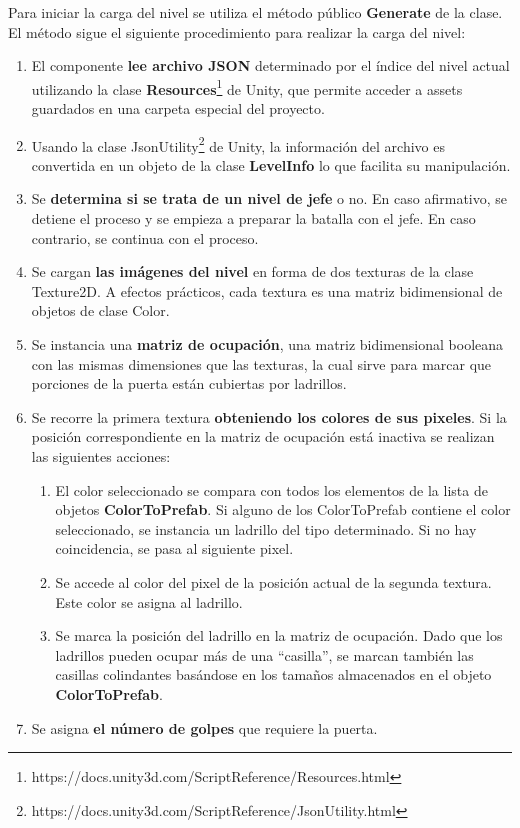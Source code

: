 Para iniciar la carga del nivel se utiliza el método público \textbf{Generate} de la clase. El método sigue el siguiente procedimiento para realizar la carga del nivel:
\begin{enumerate}
  \item El componente \textbf{lee archivo JSON} determinado por el índice del nivel actual utilizando la clase \textbf{Resources}\footnote{https://docs.unity3d.com/ScriptReference/Resources.html} de Unity, que permite acceder a assets guardados en una carpeta especial del proyecto. 
  \item Usando la clase JsonUtility\footnote{https://docs.unity3d.com/ScriptReference/JsonUtility.html} de Unity, la información del archivo es convertida en un objeto de la clase \textbf{LevelInfo} lo que facilita su manipulación.
  \item Se \textbf{determina si se trata de un nivel de jefe} o no. En caso afirmativo, se detiene el proceso y se empieza a preparar la batalla con el jefe. En caso contrario, se continua con el proceso.
  \item Se cargan \textbf{las imágenes del nivel} en forma de dos texturas de la clase Texture2D. A efectos prácticos, cada textura es una matriz bidimensional de objetos de clase Color. 
  \item Se instancia una \textbf{matriz de ocupación}, una matriz bidimensional booleana con las mismas dimensiones que las texturas, la cual sirve para marcar que porciones de la puerta están cubiertas por ladrillos.
  \item Se recorre la primera textura \textbf{obteniendo los colores de sus pixeles}. Si la posición correspondiente en la matriz de ocupación está inactiva se realizan las siguientes acciones:
  \begin{enumerate}
  \item El color seleccionado se compara con todos los elementos de la lista de objetos \textbf{ColorToPrefab}. Si alguno de los ColorToPrefab contiene el color seleccionado, se instancia un ladrillo del tipo determinado. Si no hay coincidencia, se pasa al siguiente pixel.
  \item Se accede al color del pixel de la posición actual de la segunda textura. Este color se asigna al ladrillo.
  \item Se marca la posición del ladrillo en la matriz de ocupación. Dado que los ladrillos pueden ocupar más de una ``casilla'', se marcan también las casillas colindantes basándose en los tamaños almacenados en el objeto \textbf{ColorToPrefab}.
  \end{enumerate}
  \item Se asigna \textbf{el número de golpes} que requiere la puerta.
\end{enumerate}
